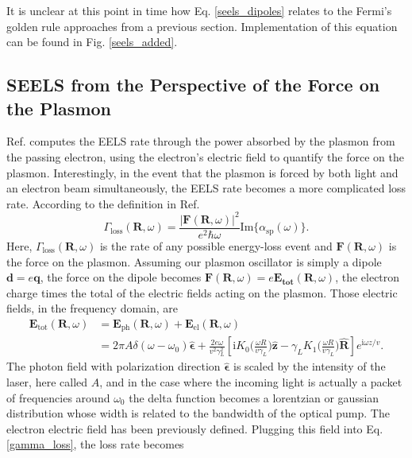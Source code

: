 \documentclass [11pt, proquest] {uwthesis}[2016/11/22]
\begin{document}
It is unclear at this point in time how Eq. \ref{seels_dipoles} relates to the Fermi's golden rule approaches from a previous section. Implementation of this equation can be found in Fig. \ref{seels_added}.

\subsection{SEELS from the Perspective of the Force on the Plasmon}

Ref. \cite{Quillin} computes the EELS rate through the power absorbed by the plasmon from the passing electron, using the electron's electric field to quantify the force on the plasmon. Interestingly, in the event that the plasmon is forced by both light and an electron beam simultaneously, the EELS rate becomes a more complicated loss rate. According to the definition in Ref. \cite{Quillin}
\begin{equation}
\Gamma_{\textrm{loss}}(\textbf{R},\omega) = \frac{|\textbf{F}(\textbf{R},\omega)|^2}{e^2\hbar\omega}\textrm{Im}\{\alpha_{\textrm{sp}}(\omega)\}.
\label{gamma_loss}
\end{equation}
Here, $\Gamma_{\textrm{loss}}(\textbf{R},\omega)$ is the rate of any possible energy-loss event and $\textbf{F}(\textbf{R},\omega)$ is the force on the plasmon. Assuming our plasmon oscillator is simply a dipole $\textbf{d}=e\textbf{q}$, the force on the dipole becomes $\textbf{F}(\textbf{R},\omega) = e\textbf{E}_{\textbf{tot}}(\textbf{R},\omega)$, the electron charge times the total of the electric fields acting on the plasmon. Those electric fields, in the frequency domain, are
\begin{equation}
\begin{aligned}
\textbf{E}_{\textrm{tot}}(\textbf{R},\omega) &= \textbf{E}_{\textrm{ph}}(\textbf{R},\omega) + \textbf{E}_{\textrm{el}}(\textbf{R},\omega)\\
& = 2\pi A\delta(\omega-\omega_0)\hat{\boldsymbol{\epsilon}} + \frac{2e\omega}{v^2\gamma_L^2}\left[ \textrm{i}K_0\big( \frac{\omega R}{v\gamma_L} \big)\hat{\textbf{z}} -  \gamma_L K_1\big( \frac{\omega R}{v\gamma_L} \big)\hat{\textbf{R}}\right]e^{\textrm{i}\omega z/v}.
\label{fields_sum}
\end{aligned}
\end{equation}
The photon field with polarization direction $\hat{\boldsymbol{\epsilon}}$ is scaled by the intensity of the laser, here called $A$, and in the case where the incoming light is actually a packet of frequencies around $\omega_0$ the delta function becomes a lorentzian or gaussian distribution whose width is related to the bandwidth of the optical pump. The electron electric field has been previously defined. Plugging this field into Eq. \ref{gamma_loss}, the loss rate becomes
\end{document}
